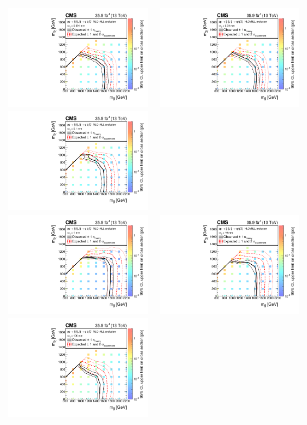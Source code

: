 \begin{figure}[!t]
  \centering
  \includegraphics[width=0.33\textwidth]{Figures/T1qqqqLL0p001XSEC}~
  \includegraphics[width=0.33\textwidth]{Figures/T1qqqqLL0p01XSEC}~
  \includegraphics[width=0.33\textwidth]{Figures/T1qqqqLL0p1XSEC}\\
  \includegraphics[width=0.33\textwidth]{Figures/T1qqqqLL1XSEC}~
  \includegraphics[width=0.33\textwidth]{Figures/T1qqqqLL10XSEC}~
  \includegraphics[width=0.33\textwidth]{Figures/T1qqqqLL100XSEC}\\

\end{figure}
